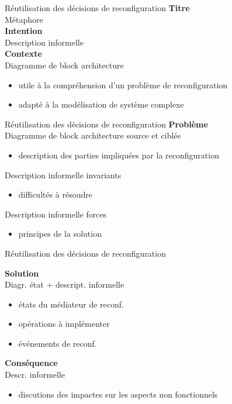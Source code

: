 \begin{frame}{Réutilisation des décisions de reconfiguration}
\textbf{Titre}\\
Métaphore\\
\vspace{5mm}
\textbf{Intention}\\
Description informelle\\
\vspace{5mm}
\textbf{Contexte}\\
Diagramme de block architecture
\begin{itemize}
\item utile à la compréhension d'un problème de reconfiguration
\item adapté à la modélisation de système complexe
\end{itemize}                                                                   
\end{frame}

\begin{frame}{Réutilisation des décisions de reconfiguration}
\textbf{Problème}\\
Diagramme de block architecture source et ciblée 
\begin{itemize}
\item description des parties impliquées par la reconfiguration 
\end{itemize}
Description informelle invariants
\begin{itemize}
\item difficultés à résoudre
\end{itemize}             
Description informelle forces      
\begin{itemize}
    \item principes de la solution
\end{itemize}

\end{frame}

\begin{frame}{Réutilisation des décisions de reconfiguration}
            
\textbf{Solution}\\
Diagr. état + descript. informelle                                                              
\begin{itemize}
\item états du médiateur de reconf.
\item opérations à implémenter
\item événements de reconf.
\end{itemize}   
\vspace{5mm}
\textbf{Conséquence}\\
Descr. informelle
\begin{itemize}
\item discutions des impactes sur les aspects non fonctionnels
\end{itemize}             

\end{frame}



